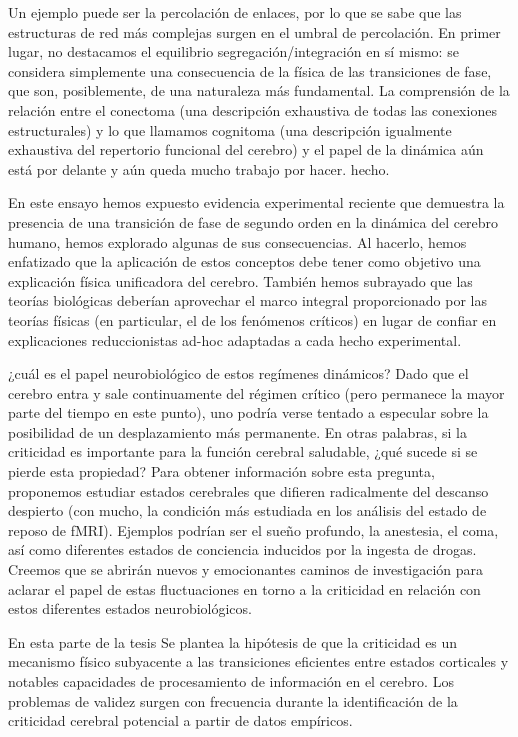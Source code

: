 Un ejemplo puede ser la percolación de enlaces, por lo que se sabe que las estructuras de red más complejas surgen en el umbral de percolación. En primer lugar, no destacamos el equilibrio segregación/integración en sí mismo: se considera simplemente una consecuencia de la física de las transiciones de fase, que son, posiblemente, de una naturaleza más fundamental. La comprensión de la relación entre el conectoma (una descripción exhaustiva de todas las conexiones estructurales) y lo que llamamos cognitoma (una descripción igualmente exhaustiva del repertorio funcional del cerebro) y el papel de la dinámica aún está por delante y aún queda mucho trabajo por hacer. hecho.

En este ensayo hemos expuesto evidencia experimental reciente que demuestra la presencia de una transición de fase de segundo orden en la dinámica del cerebro humano, hemos explorado algunas de sus consecuencias. Al hacerlo, hemos enfatizado que la aplicación de estos conceptos debe tener como objetivo una explicación física unificadora del cerebro. También hemos subrayado que las teorías biológicas deberían aprovechar el marco integral proporcionado por las teorías físicas (en particular, el de los fenómenos críticos) en lugar de confiar en explicaciones reduccionistas ad-hoc adaptadas a cada hecho experimental.

¿cuál es el papel neurobiológico de estos regímenes dinámicos? Dado que el cerebro entra y sale continuamente del régimen crítico (pero permanece la mayor parte del tiempo en este punto), uno podría verse tentado a especular sobre la posibilidad de un desplazamiento más permanente. En otras palabras, si la criticidad es importante para la función cerebral saludable, ¿qué sucede si se pierde esta propiedad? Para obtener información sobre esta pregunta, proponemos estudiar estados cerebrales que difieren radicalmente del descanso despierto (con mucho, la condición más estudiada en los análisis del estado de reposo de fMRI). Ejemplos podrían ser el sueño profundo, la anestesia, el coma, así como diferentes estados de conciencia inducidos por la ingesta de drogas. Creemos que se abrirán nuevos y emocionantes caminos de investigación para aclarar el papel de estas fluctuaciones en torno a la criticidad en relación con estos diferentes estados neurobiológicos.



En esta parte de la tesis Se plantea la hipótesis de que la criticidad es un mecanismo físico subyacente a las transiciones eficientes entre estados corticales y notables capacidades de procesamiento de información en el cerebro.   Los problemas de validez surgen con frecuencia durante la identificación de la criticidad cerebral potencial a partir de datos empíricos.




